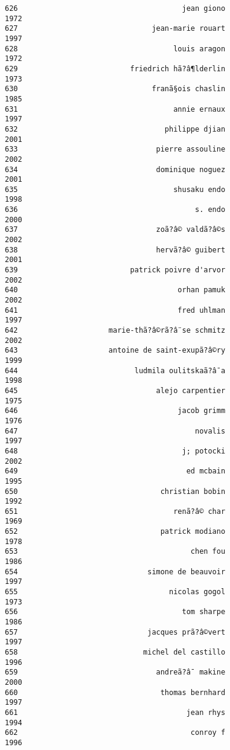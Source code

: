 \documentclass[
]{report}
\begin{document}
\begin{verbatim}
626                                      jean giono                1972
627                               jean-marie rouart                1997
628                                    louis aragon                1972
629                          friedrich hã?â¶lderlin                1973
630                               franã§ois chaslin                1985
631                                    annie ernaux                1997
632                                  philippe djian                2001
633                                pierre assouline                2002
634                                dominique noguez                2001
635                                    shusaku endo                1998
636                                         s. endo                2000
637                                zoã?â© valdã?â©s                2002
638                                hervã?â© guibert                2001
639                          patrick poivre d'arvor                2002
640                                     orhan pamuk                2002
641                                     fred uhlman                1997
642                     marie-thã?â©rã?â¨se schmitz                2002
643                     antoine de saint-exupã?â©ry                1999
644                           ludmila oulitskaã?â¯a                1998
645                                alejo carpentier                1975
646                                     jacob grimm                1976
647                                         novalis                1997
648                                      j; potocki                2002
649                                       ed mcbain                1995
650                                 christian bobin                1992
651                                    renã?â© char                1969
652                                 patrick modiano                1978
653                                        chen fou                1986
654                              simone de beauvoir                1997
655                                   nicolas gogol                1973
656                                      tom sharpe                1986
657                              jacques prã?â©vert                1997
658                             michel del castillo                1996
659                                andreã?â¯ makine                2000
660                                 thomas bernhard                1997
661                                       jean rhys                1994
662                                        conroy f                1996

\end{verbatim}
\end{document}
